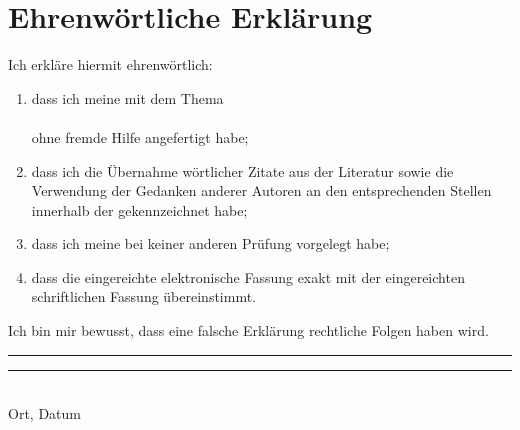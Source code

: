 \documentclass[fontsize=12pt,listof=totoc]{scrreprt}
\newif\ifglossary
\newif\ifroman
\newcommand{\Textpath}{../text/text.tex}
\begin{document}
	\iftotaltables
		\listoftables
	\fi

	\ifroman
		\newpage
		\newcounter{lastroman}
		\setcounter{lastroman}{\value{page}}
		\pagenumbering{arabic}
	\fi
	
	
	\ifroman
		\newpage
		\pagenumbering{Roman}
		\setcounter{page}{\value{lastroman}}
	\fi
	\ifglossary
		\printglossaries
	\fi

	\printbibliography[heading=bibintoc]{}
		
	\newpage
	\hypertarget{decl}{}
	\chapter*{Ehrenwörtliche Erklärung}
		\thispagestyle{empty}
		Ich erkläre hiermit ehrenwörtlich:
		\renewcommand\labelenumi{\arabic{enumi})}
		\begin{enumerate}
			\item dass ich meine \Arbeitstyp{} mit dem Thema \\
				\textbf{\Titel} \\
				ohne fremde Hilfe angefertigt habe; 
			\item dass ich die Übernahme wörtlicher Zitate aus der Literatur sowie die Verwendung der Gedanken anderer Autoren an den entsprechenden Stellen innerhalb der \Arbeitstyp{} gekennzeichnet habe;
			\item dass ich meine \Arbeitstyp{} bei keiner anderen Prüfung vorgelegt habe;
			\item dass die eingereichte elektronische Fassung exakt mit der eingereichten schriftlichen Fassung übereinstimmt.\\
		\end{enumerate} 
		Ich bin mir bewusst, dass eine falsche Erklärung rechtliche Folgen haben wird.
		\vfill
		\noindent
		\rule[-7px]{120px}{.4pt}\hfill\rule[-7px]{120px}{.4pt}\\
		Ort, Datum\hfill{}
\end{document}
